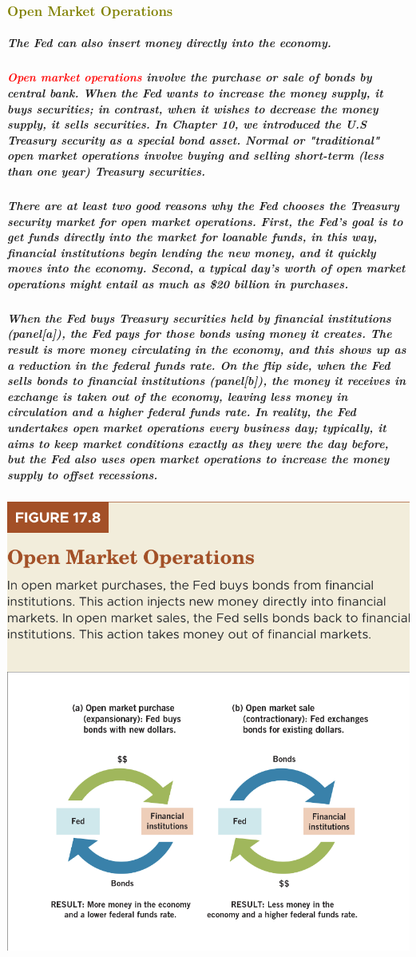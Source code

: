 \documentclass[11pt]{article} %
\begin{document}
{\subsubsection*{\textcolor{olive}{Open Market Operations}}
\subparagraph*{The Fed can also insert money directly into the economy.}
\subparagraph*{\textbf{\textcolor{red}{Open market operations}} involve the purchase or sale of bonds by central bank. When the Fed wants to increase the money supply, it buys securities; in contrast, when it wishes to decrease the money supply, it sells securities. In Chapter 10, we introduced the U.S Treasury security as a special bond asset. Normal or "traditional" open market operations involve buying and selling short-term (less than one year) Treasury securities.}
\subparagraph*{There are at least two good reasons why the Fed chooses the Treasury security market for open market operations. First, the Fed's goal is to get funds directly into the market for loanable funds, in this way, financial institutions begin lending the new money, and it quickly moves into the economy. Second, a typical day's worth of open market operations might entail as much as \$20 billion in purchases.}
\subparagraph*{When the Fed buys Treasury securities held by financial institutions (panel[a]), the Fed pays for those bonds using money it creates. The result is more money circulating in the economy, and this shows up as a reduction in the federal funds rate. On the flip side, when the Fed sells bonds to financial institutions (panel[b]), the money it receives in exchange is taken out of the economy, leaving less money in circulation and a higher federal funds rate. In reality, the Fed undertakes open market operations every business day; typically, it aims to keep market conditions exactly as they were the day before, but the Fed also uses open market operations to increase the money supply to offset recessions.}
\begin{center}
\includegraphics[scale=0.5]{images/Figure 17.8.png} 

\end{center}}
\end{document}
